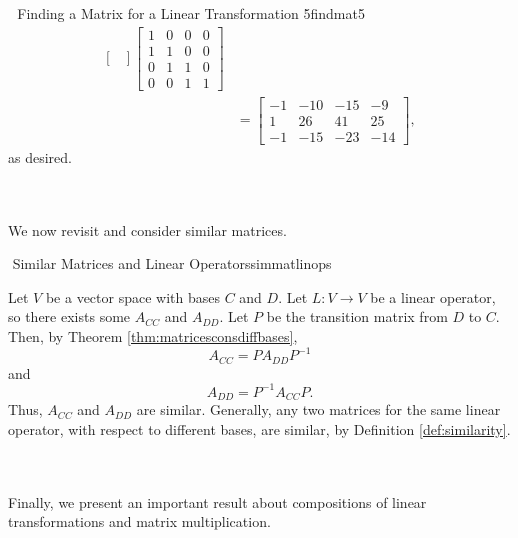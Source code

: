 \begin{example}{\Difficulty\,\Difficulty\,\Difficulty\,\,Finding a Matrix for a Linear Transformation 5}{findmat5}
\begin{align*}
\begin{bmatrix}
                \end{bmatrix}\begin{bmatrix}
                1 & 0 & 0 & 0 \\
                1 & 1 & 0 & 0 \\
                0 & 1 & 1 & 0 \\
                0 & 0 & 1 & 1
            \end{bmatrix} \\
            &=\begin{bmatrix}
                -1 & -10 & -15 & -9 \\
                1 & 26 & 41 & 25 \\
                -1 & -15 & -23 & -14
            \end{bmatrix},
            \end{align*}
            as desired.
            
        \end{example}
        \vphantom
        \\
        \\
        We now revisit and consider similar matrices.
        \begin{theorem}{\Stop\,\,Similar Matrices and Linear Operators}{simmatlinops}

            Let \(V\) be a vector space with bases \(C\) and \(D\). Let \(L:V\to V\) be a linear operator, so there exists some \(A_{CC}\) and \(A_{DD}\). Let \(P\) be the transition matrix from \(D\) to \(C\). Then, by Theorem \ref{thm:matricesconsdiffbases}, 
            \begin{equation*}
                A_{CC}=PA_{DD}P^{-1}
            \end{equation*}
            and
            \begin{equation*}
                A_{DD}=P^{-1}A_{CC}P.
            \end{equation*}
            Thus, \(A_{CC}\) and \(A_{DD}\) are similar. Generally, any two matrices for the same linear operator, with respect to different bases, are similar, by Definition \ref{def:similarity}.
             
        \end{theorem}
        \vphantom
        \\
        \\
        Finally, we present an important result about compositions of linear transformations and matrix multiplication.
